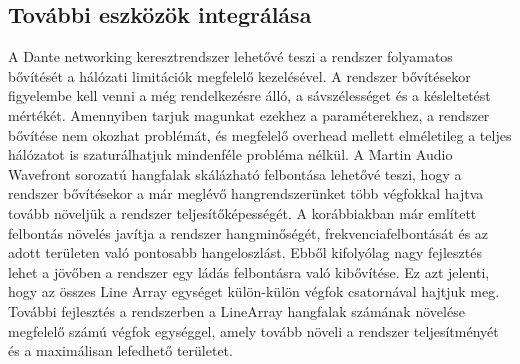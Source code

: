 \subsection{További eszközök integrálása}
A Dante networking keresztrendszer lehetővé teszi a rendszer folyamatos bővítését a
hálózati limitációk megfelelő kezelésével. A rendszer bővítésekor figyelembe kell venni a
még rendelkezésre álló, a sávszélességet és a késleltetést mértékét. Amennyiben
tarjuk magunkat ezekhez a paraméterekhez, a rendszer bővítése nem okozhat problémát,
és megfelelő overhead mellett elméletileg a teljes hálózatot is szaturálhatjuk mindenféle probléma nélkül.
A Martin Audio Wavefront sorozatú hangfalak skálázható felbontása lehetővé teszi, hogy
a rendszer bővítésekor a már meglévő hangrendszerünket több végfokkal hajtva tovább
növeljük a rendszer teljesítőképességét. A korábbiakban már említett felbontás növelés
javítja a rendszer hangminőségét, frekvenciafelbontását és az adott területen való
pontosabb hangeloszlást. Ebből kifolyólag nagy fejlesztés lehet a jövőben a rendszer egy ládás
felbontásra való kibővítése. Ez azt jelenti, hogy az összes Line Array egységet külön-külön
végfok csatornával hajtjuk meg.
További fejlesztés a rendszerben a LineArray hangfalak számának növelése megfelelő számú végfok egységgel,
amely tovább növeli a rendszer teljesítményét és a maximálisan lefedhető területet.
